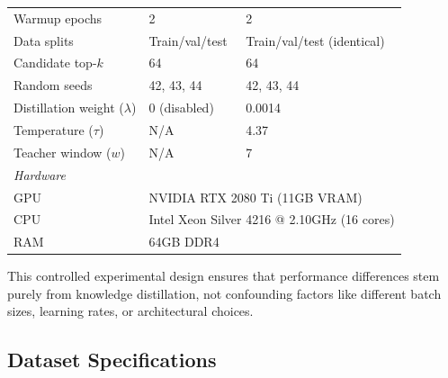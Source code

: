 \begin{table}[H]
\begin{tabular}{lll}
        Warmup epochs                   & 2                                                               & 2                                 \\
        Data splits                     & Train/val/test                                                  & Train/val/test (identical)        \\
        Candidate top-$k$               & 64                                                              & 64                                \\
        Random seeds                    & 42, 43, 44                                                      & 42, 43, 44                        \\
        \midrule
        Distillation weight ($\lambda$) & 0 (disabled)                                                    & 0.0014                            \\
        Temperature ($\tau$)            & N/A                                                             & 4.37                              \\
        Teacher window ($w$)            & N/A                                                             & 7                                 \\
        \midrule
        \multicolumn{3}{l}{\textit{Hardware}}                                                                                                 \\
        \quad GPU                       & \multicolumn{2}{l}{NVIDIA RTX 2080 Ti (11GB VRAM)}                                                  \\
        \quad CPU                       & \multicolumn{2}{l}{Intel Xeon Silver 4216 @ 2.10GHz (16 cores)}                                     \\
        \quad RAM                       & \multicolumn{2}{l}{64GB DDR4}                                                                       \\
        \bottomrule
    \end{tabular}
\end{table}

This controlled experimental design ensures that performance differences stem purely from knowledge distillation, not confounding factors like different batch sizes, learning rates, or architectural choices.

\subsection{Dataset Specifications}
\label{app:datasets}

